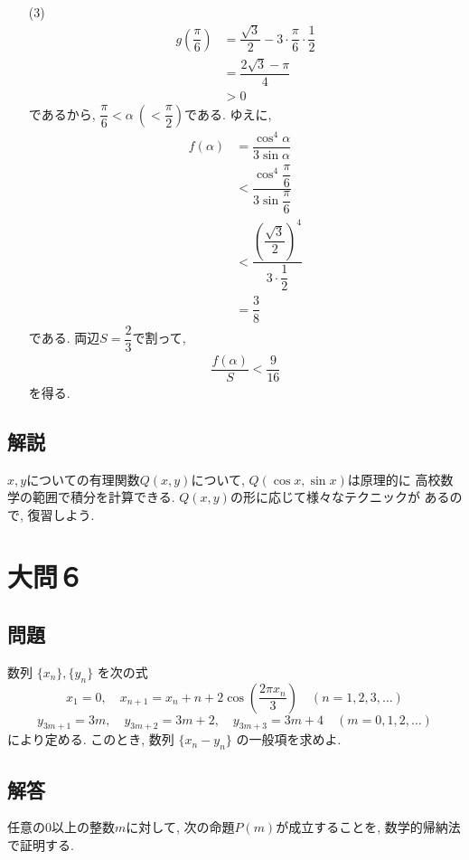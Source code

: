 \documentclass[dvipdfmx,a4paper]{jsarticle}
\newcommand{\al}{\alpha}
\newcommand{\2}{I\hspace{-1pt}I}
\newcommand{\3}{I\hspace{-1pt}I\hspace{-1pt}I}
\begin{document}
\begin{itemize}
        \item [(3)] 
        \begin{align*}
            g\left(\dfrac{\pi}{6}\right) 
            &= \dfrac{\sqrt{3}}{2} -3 \cdot \dfrac{\pi}{6} \cdot \dfrac{1}{2} \\
            &= \dfrac{2\sqrt{3} - \pi }{4} \\
            & >0
        \end{align*}
        であるから, $\dfrac{\pi}{6} < \al   \ \left(< \dfrac{\pi}{2}\right)$である. ゆえに, 
        \begin{align*}
            f(\al) 
            &= \dfrac{\cos ^4 \al}{3\sin \al} \\
            &< \dfrac{\cos ^4 \dfrac{\pi}{6}}{3\sin \dfrac{\pi}{6}} \\
            &< \dfrac{\left(\dfrac{\sqrt{3}}{2}\right)^4}{3\cdot \dfrac{1}{2}} \\
            & = \dfrac{3}{8}
        \end{align*}
        である. 両辺$S=\dfrac{2}{3}$で割って, 
        \begin{align*}
            \dfrac{f(\al)}{S} < \dfrac{9}{16}
        \end{align*}
        を得る. 
    \end{itemize}

    \subsection{解説}
    $x,y$についての有理関数$Q(x,y)$について, $Q(\cos x, \sin x)$は原理的に
    高校数学の範囲で積分を計算できる. $Q(x,y)$の形に応じて様々なテクニックが
    あるので, 復習しよう. 



    \section{大問６}
    \subsection{問題}
    数列 $\{x_n\}, \{y_n\}$ を次の式
    \[
        x_1 = 0, \quad x_{n+1} = x_n + n + 2\cos\left( \frac{2\pi x_n}{3} \right) \quad (n=1, 2, 3, \ldots)
    \]
    \[
        y_{3m+1} = 3m, \quad y_{3m+2} = 3m+2, \quad y_{3m+3} = 3m+4 \quad (m=0, 1, 2, \ldots)
    \]
    により定める. このとき, 数列 $\{x_n - y_n\}$ の一般項を求めよ. 

    \subsection{解答}
    任意の0以上の整数$m$に対して, 次の命題$P(m)$が成立することを, 数学的帰納法で証明する. 
    
\end{document}
